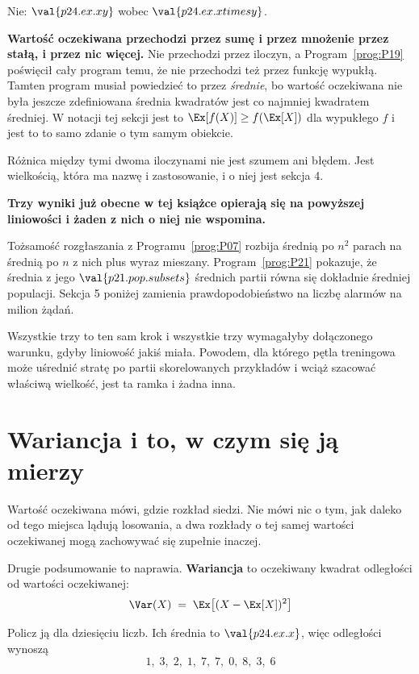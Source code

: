 \begin{fr}
\begin{ansblock}
Nie: $\val{p24.ex.xy}$ wobec $\val{p24.ex.xtimesy}$.
\end{ansblock}

\textbf{Wartość oczekiwana przechodzi przez sumę i przez mnożenie przez stałą,
i przez nic więcej.} Nie przechodzi przez iloczyn, a Program~\ref{prog:P19}
poświęcił cały program temu, że nie przechodzi też przez funkcję wypukłą. Tamten
program musiał powiedzieć to przez \emph{średnie}, bo wartość oczekiwana nie
była jeszcze zdefiniowana \dash{} średnia kwadratów jest co najmniej kwadratem
średniej. W notacji tej sekcji jest to $\Ex[f(X)] \ge f(\Ex[X])$ dla wypukłego
$f$ i jest to to samo zdanie o tym samym obiekcie.

Różnica między tymi dwoma iloczynami nie jest szumem ani błędem. Jest
wielkością, która ma nazwę i zastosowanie, i o niej jest sekcja 4.
\end{fr}

\begin{fr}
\begin{aibox}
\textbf{Trzy wyniki już obecne w tej książce opierają się na powyższej
liniowości i żaden z nich o niej nie wspomina.}

Tożsamość rozgłaszania z Programu~\ref{prog:P07} rozbija średnią po $n^{2}$
parach na średnią po $n$ z nich plus wyraz mieszany. Program~\ref{prog:P21}
pokazuje, że średnia z jego $\val{p21.pop.subsets}$ średnich partii równa się
dokładnie średniej populacji. Sekcja 5 poniżej zamienia prawdopodobieństwo na
liczbę alarmów na milion żądań.

Wszystkie trzy to ten sam krok i wszystkie trzy wymagałyby dołączonego
warunku, gdyby liniowość jakiś miała. Powodem, dla którego pętla treningowa
może uśrednić stratę po partii skorelowanych przykładów i wciąż szacować
właściwą wielkość, jest ta ramka i żadna inna.
\end{aibox}
\end{fr}

\section{Wariancja i to, w czym się ją mierzy}
\label{sec:P24-variance}

\begin{fr}
Wartość oczekiwana mówi, gdzie rozkład siedzi. Nie mówi nic o tym, jak daleko
od tego miejsca lądują losowania, a dwa rozkłady o tej samej wartości
oczekiwanej mogą zachowywać się zupełnie inaczej.

Drugie podsumowanie to naprawia. \textbf{Wariancja} to oczekiwany kwadrat
odległości od wartości oczekiwanej:
\[ \Var(X) \;=\; \Ex\bigl[(X - \Ex[X])^{2}\bigr] \]

Policz ją dla dziesięciu liczb. Ich średnia to $\val{p24.ex.x}$, więc
odległości wynoszą
\[ 1,\; 3,\; 2,\; 1,\; 7,\; 7,\; 0,\; 8,\; 3,\; 6 \]
\dotline
\nextframe
\end{fr}

